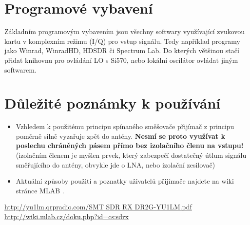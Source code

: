 \documentclass[12pt,a4paper,oneside]{article}
\begin{document}
\section{Programové vybavení}

Základním programovým vybavením jsou všechny softwary využívající zvukovou kartu v komplexním režimu (I/Q) pro vstup signálu. Tedy například programy jako Winrad, WinradHD, HDSDR či Spectrum Lab. Do kterých většinou stačí přidat knihovnu pro ovládání LO s Si570, nebo lokální oscilátor ovládat jiným softwarem.

\section{Důležité poznámky k používání}
\begin{itemize}
\item Vzhledem k použitému principu spínaného směšovače přijímač z principu poměrně silně vyzařuje zpět do antény. \textbf{Nesmí se proto využívat k poslechu chráněných pásem přímo bez izolačního členu na vstupu!} (izolačním členem je myšlen prvek, který zabezpečí dostatečný útlum signálu směřujícího do antény, obvykle jde o LNA, nebo izolační zesilovač)

\item Aktuální způsoby použití a poznatky uživatelů přijímače najdete na wiki stránce MLAB \cite{SDRX}.
\end{itemize}

\begin{thebibliography}{99}
\href{http://yu1lm.qrpradio.com/SMT SDR RX DR2G-YU1LM.pdf}{http://yu1lm.qrpradio.com/SMT SDR RX DR2G-YU1LM.pdf}
\href{http://wiki.mlab.cz/doku.php?id=cs:sdrx}{http://wiki.mlab.cz/doku.php?id=cs:sdrx}
\end{thebibliography}
\end{document}
